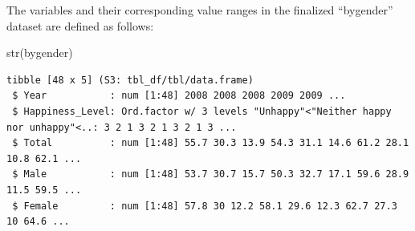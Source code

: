 \documentclass[
  11pt,
  a4paper,
  DIV=11,
  numbers=noendperiod]{scrartcl}
\newenvironment{Shaded}{\begin{snugshade}}{\end{snugshade}}
\newcommand{\AttributeTok}[1]{\textcolor[rgb]{0.40,0.45,0.13}{#1}}
\newcommand{\ConstantTok}[1]{\textcolor[rgb]{0.56,0.35,0.01}{#1}}
\newcommand{\FunctionTok}[1]{\textcolor[rgb]{0.28,0.35,0.67}{#1}}
\newcommand{\NormalTok}[1]{\textcolor[rgb]{0.00,0.23,0.31}{#1}}
\newcommand{\OtherTok}[1]{\textcolor[rgb]{0.00,0.23,0.31}{#1}}
\newcommand{\SpecialCharTok}[1]{\textcolor[rgb]{0.37,0.37,0.37}{#1}}
\newcommand{\StringTok}[1]{\textcolor[rgb]{0.13,0.47,0.30}{#1}}
\begin{document}
\begin{Shaded}
\end{Shaded}

\begin{table}
\centering
{}
\end{table}

The variables and their corresponding value ranges in the finalized
``bygender'' dataset are defined as follows:

\begin{Shaded}
\begin{Highlighting}[]
 \FunctionTok{str}\NormalTok{(bygender)}
\end{Highlighting}
\end{Shaded}

\begin{verbatim}
tibble [48 x 5] (S3: tbl_df/tbl/data.frame)
 $ Year           : num [1:48] 2008 2008 2008 2009 2009 ...
 $ Happiness_Level: Ord.factor w/ 3 levels "Unhappy"<"Neither happy nor unhappy"<..: 3 2 1 3 2 1 3 2 1 3 ...
 $ Total          : num [1:48] 55.7 30.3 13.9 54.3 31.1 14.6 61.2 28.1 10.8 62.1 ...
 $ Male           : num [1:48] 53.7 30.7 15.7 50.3 32.7 17.1 59.6 28.9 11.5 59.5 ...
 $ Female         : num [1:48] 57.8 30 12.2 58.1 29.6 12.3 62.7 27.3 10 64.6 ...
\end{verbatim}
\end{document}
